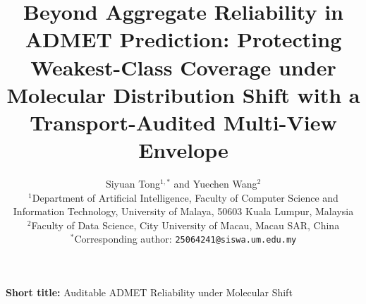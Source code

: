 \documentclass[11pt]{article}
\title{Beyond Aggregate Reliability in ADMET Prediction: Protecting Weakest-Class Coverage under Molecular Distribution Shift with a Transport-Audited Multi-View Envelope}
\author{
\begin{minipage}{0.94\textwidth}
\centering
Siyuan Tong$^{1,*}$ and Yuechen Wang$^{2}$\\[0.45em]
\small $^{1}$Department of Artificial Intelligence, Faculty of Computer Science and Information Technology, University of Malaya, 50603 Kuala Lumpur, Malaysia\\
\small $^{2}$Faculty of Data Science, City University of Macau, Macau SAR, China\\[0.30em]
\small $^{*}$Corresponding author: \texttt{25064241@siswa.um.edu.my}
\end{minipage}
}
\date{}
\begin{document}
\maketitle

\begin{center}
\small\textbf{Short title:} Auditable ADMET Reliability under Molecular Shift
\end{center}










\end{document}
